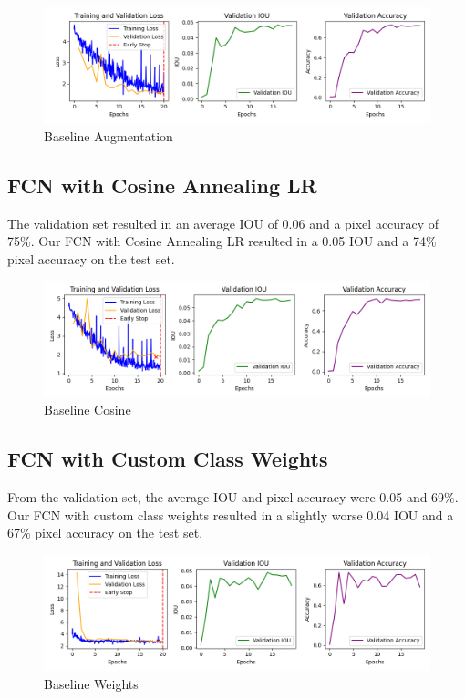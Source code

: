 \begin{figure}[H]
	\centering
	\includegraphics[width=\textwidth]{plots/baseline_augmentation}
	\caption{Baseline Augmentation}
	\label{fig:baseline_aug}
\end{figure}

\subsection*{FCN with Cosine Annealing LR}

The validation set resulted in an average IOU of 0.06 and a pixel accuracy of 75\%. Our FCN with Cosine Annealing LR resulted in a 0.05 IOU and a 74\% pixel accuracy on the test set.


\begin{figure}[H]
	\centering
	\includegraphics[width=\textwidth]{plots/baseline_cosine}
	\caption{Baseline Cosine}
	\label{fig:baseline_cos}
\end{figure}

\subsection*{FCN with Custom Class Weights}


From the validation set, the average IOU and pixel accuracy were 0.05 and 69\%. Our FCN with custom class weights resulted in a slightly worse 0.04 IOU and a 67\% pixel accuracy on the test set.

\begin{figure}[H]
	\centering
	\includegraphics[width=\textwidth]{plots/baseline_weights}
	\caption{Baseline Weights}
	\label{fig:baseline_weights}
\end{figure}

